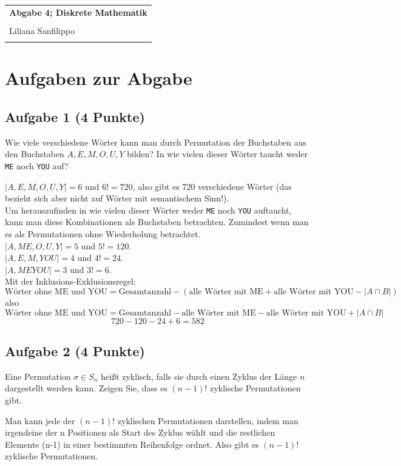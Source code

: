 \documentclass{article} %
\newcommand{\titulo}{Abgabe 4; Diskrete Mathematik}
\newcommand{\nombre}{Liliana Sanfilippo}
\begin{document}
\begin{tabular}{p{12cm}}
{{\Large\bf\titulo}}\\
\vspace{0.2cm}\\
 {\large\nombre}\\
 \vspace{0.2cm}\\   
\end{tabular}
\section*{Aufgaben zur Abgabe}
\subsection*{Aufgabe 1 (4 Punkte)}
Wie viele verschiedene Wörter kann man durch Permutation der Buchstaben aus den
Buchstaben \( A, E, M, O, U, Y \) bilden? In wie vielen dieser Wörter taucht weder \texttt{ME} noch \texttt{YOU} auf?
\begin{mybox}
 \(| A, E, M, O, U, Y | = 6\) und $6! = 720$, also gibt es 720 verschiedene Wörter (das bezieht sich aber nicht auf Wörter mit semantischem Sinn!). \\ 
 Um herauszufinden in wie vielen dieser Wörter weder \texttt{ME} noch \texttt{YOU} auftaucht, kann man diese Kombinationen als Buchstaben betrachten.  Zumindest wenn man es als Permutationen ohne Wiederholung betrachtet. \\
  \(| A, ME, O, U, Y | = 5\) und $5! = 120$. \\
   \(| A, E, M, YOU | = 4\) und $4! = 24$. \\
      \(| A, ME YOU | = 3\) und $3! = 6$. \\
      Mit der Inklusions-Exklusionsregel: 
       \[
\text{Wörter ohne ME und YOU} = \text{Gesamtanzahl} -( \text{alle Wörter mit ME} + \text{alle Wörter mit YOU} - |A \cap B|)
\] also
      \[
\text{Wörter ohne ME und YOU} = \text{Gesamtanzahl} - \text{alle Wörter mit ME} - \text{alle Wörter mit YOU} + |A \cap B|
\]
      \[
      720-120-24+6=582
      \]
\end{mybox}
\subsection*{Aufgabe 2 (4 Punkte)}
Eine Permutation \( \sigma \in S_n \) heißt zyklisch, falls sie durch einen Zyklus der Länge \( n \) dargestellt
werden kann. Zeigen Sie, dass es \( (n - 1)! \) zyklische Permutationen gibt.
\begin{mybox}
Man kann jede der \( (n - 1)! \) zyklischen Permutationen darstellen, indem man irgendeine der n Positionen als Start des Zyklus wählt und die restlichen Elemente (n-1) in einer bestimmten Reihenfolge ordnet. Also gibt es \( (n - 1)! \) zyklische Permutationen.
\end{mybox}
\end{document}
